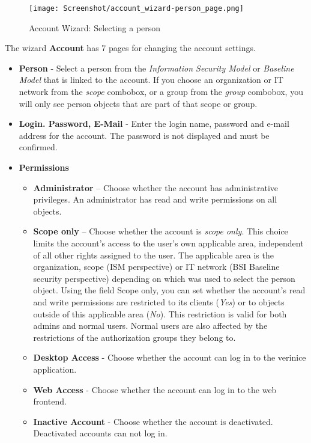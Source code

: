 \documentclass[a4paper,10pt]{book}
\begin{document}
\begin{figure}[htb!]
  \centering
  \texttt{[image: Screenshot/account\_wizard-person\_page.png]}
  \caption{\label{Account Wizard: Selecting a person} Account Wizard: Selecting a person}
\end{figure}

The wizard \textbf{Account} has 7 pages for changing the account settings.

\begin{itemize}
\item \textbf{Person} - Select a person from the \textit{Information Security Model} or \textit{Baseline Model} that is linked to the account. If you choose an organization or IT network from the \textit{scope} combobox, or a group from the \textit{group} combobox, you will only see person objects that are part of that scope or group.
\item \textbf{Login. Password, E-Mail} - Enter the login name, password and e-mail address for the account. The password is not displayed and must be confirmed.
\item \textbf{Permissions} \begin{itemize}
\item \textbf{Administrator} – Choose whether the account has administrative privileges. An administrator has read and write permissions on all objects.
\item \textbf{Scope only} – Choose whether the account is \textit{scope only}. This choice limits the account’s access to the user’s own applicable area, independent of all other rights assigned to the user. The applicable area is the organization, scope (ISM perspective) or IT network (BSI Baseline security perspective) depending on which was used to select the person object. Using the field Scope only, you can set whether the account’s read and write permissions are restricted to its clients (\textit{Yes}) or to objects outside of this applicable area (\textit{No}). This restriction is valid for both admins and normal users. Normal users are also affected by the restrictions of the authorization groups they belong to.
\item \textbf{Desktop Access} - Choose whether the account can log in to the verinice application.
\item \textbf{Web Access} - Choose whether the account can log in to the web frontend.
\item \textbf{Inactive Account} - Choose whether the account is deactivated. Deactivated accounts can not log in.
\end{itemize}

\end{itemize}
\end{document}
